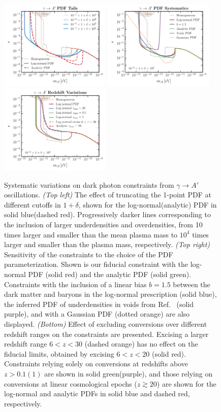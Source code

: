 \documentclass[prd,aps,10pt,nofootinbib,twocolumn,superscriptaddress,preprintnumbers,balancelastpage,longbibliography]{revtex4-1}
\begin{document}
%
\begin{figure}[tbp]
    \centering
    \includegraphics[width=0.47\textwidth]{plots/limit_dp_pdf_tails}
    \includegraphics[width=0.47\textwidth]{plots/limit_dp_pdfs}
    \includegraphics[width=0.47\textwidth]{plots/limit_dp_redshifts}
    \caption{Systematic variations on dark photon constraints from $\gamma\to A'$ oscillations. \emph{(Top left)} The effect of truncating the 1-point PDF at different cutoffs in $1 + \delta$, shown for the log-normal(analytic) PDF in solid blue(dashed red). Progressively darker lines corresponding to the inclusion of larger underdensities and overdensities, from 10 times larger and smaller than the mean plasma mass to $10^4$ times larger and smaller than the plasma mass, respectively. \emph{(Top right)} Sensitivity of the constraints to the choice of the PDF parameterization. Shown is our fiducial constraint with the log-normal PDF (solid red) and the analytic PDF (solid green). Constraints with the inclusion of a linear bias $b=1.5$ between the dark matter and baryons in the log-normal prescription (solid blue), the inferred PDF of underdensities in voids from Ref.~\cite{Adermann:2018jba} (solid purple), and with a Gaussian PDF (dotted orange) are also displayed. \emph{(Bottom)} Effect of excluding conversions over different redshift ranges on the constraints are presented. Excising a larger redshift range $6 < z < 30$ (dashed orange) has no effect on the fiducial limits, obtained by excising $6 < z < 20$ (solid red). Constraints relying solely on conversions at redshifts above $z > 0.1(1)$ are shown in solid green(purple), and those relying on conversions at linear cosmological epochs ($z \gtrsim 20$) are shown for the log-normal and analytic PDFs in solid blue and dashed red, respectively. } 

\end{figure}
\end{document}
